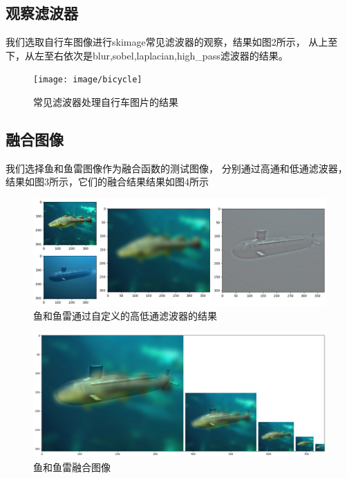 \subsection{观察滤波器}
我们选取自行车图像进行skimage常见滤波器的观察，结果如图2所示，
从上至下，从左至右依次是blur,sobel,laplacian,high_pass滤波器的结果。
\begin{figure}
	\centering
	\texttt{[image: image/bicycle]}
	\caption{常见滤波器处理自行车图片的结果}
	\label{图2：}
\end{figure}


\subsection{融合图像}
我们选择鱼和鱼雷图像作为融合函数的测试图像，
分别通过高通和低通滤波器，结果如图3所示，它们的融合结果结果如图4所示
\begin{figure}
	\centering
	\includegraphics[width=0.7\linewidth]{image/fish_and_marine}
	\caption{鱼和鱼雷通过自定义的高低通滤波器的结果}
	\label{图3：}
\end{figure}



\begin{figure}
	\centering
	\includegraphics[width=0.7\linewidth]{image/hybrid}
	\caption{鱼和鱼雷融合图像}
	\label{图4：}
\end{figure}

